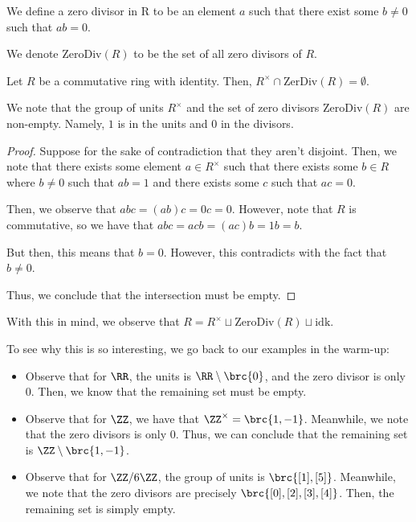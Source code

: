 \documentclass[openany]{book}
\begin{document}
\begin{defn}
	We define a zero divisor in R to be an element $a$ such that there exist some $b \neq 0$ such that $ab = 0$.
	
	We denote $\mathrm{ZeroDiv}(R)$ to be the set of all zero divisors of $R$.
\end{defn}

\begin{prop}
	Let $R$ be a commutative ring with identity. Then, $R^{\times} \cap \mathrm{ZerDiv}(R) = \emptyset$.
\end{prop}
\begin{rmk}
	We note that the group of units $R^{\times}$ and the set of zero divisors $\mathrm{ZeroDiv}(R)$ are non-empty. Namely, $1$ is in the units and $0$ in the divisors.
\end{rmk}
\begin{proof}
	Suppose for the sake of contradiction that they aren't disjoint. Then, we note that there exists some element $a \in R^{\times}$ such that there exists some $b \in R$ where $b \neq 0$ such that $ab = 1$ and there exists some $c$ such that $ac = 0$.
	
	Then, we observe that $abc = (ab)c = 0c = 0$. However, note that $R$ is commutative, so we have that $abc = acb = (ac)b = 1b = b$.
	
	But then, this means that $b = 0$. However, this contradicts with the fact that $b \neq 0$.
	
	Thus, we conclude that the intersection must be empty.
\end{proof}

With this in mind, we observe that $R = R^{\times} \sqcup \mathrm{ZeroDiv}(R) \sqcup \mathrm{idk}$.

To see why this is so interesting, we go back to our examples in the warm-up:
\begin{itemize}
	\item Observe that for $\RR$, the units is $\RR \setminus \brc{0}$, and the zero divisor is only $0$. Then, we know that the remaining set must be empty.
	\item Observe that for $\ZZ$, we have that $\ZZ^{\times} = \brc{1, -1}$. Meanwhile, we note that the zero divisors is only $0$. Thus, we can conclude that the remaining set is $\ZZ\setminus\brc{1,-1}$.	
	\item Observe that for $\ZZ/6\ZZ$, the group of units is $\brc{[1], [5]}$. Meanwhile, we note that the zero divisors are precisely $\brc{[0], [2], [3], [4]}$. Then, the remaining set is simply empty.
\end{itemize}
\end{document}
